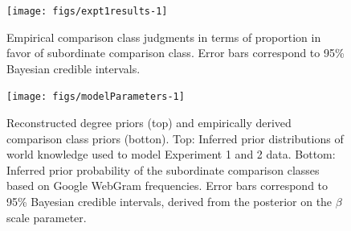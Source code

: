 \documentclass[doc]{apa6}
\begin{document}

\begin{figure}[htb]

{\centering \texttt{[image: figs/expt1results-1]} 

}

\caption{Empirical comparison class judgments in terms of proportion in favor of subordinate comparison class.  Error bars correspond to 95\% Bayesian credible intervals.}\label{fig:expt1results}
\end{figure}

\begin{figure}[htb]

{\centering \texttt{[image: figs/modelParameters-1]} 

}

\caption{Reconstructed degree priors (top) and empirically derived comparison class priors (botton). Top: Inferred prior distributions of world knowledge used to model Experiment 1 and 2 data. Bottom: Inferred prior probability of the subordinate comparison classes based on Google WebGram frequencies. Error bars correspond to 95\% Bayesian credible intervals, derived from the posterior on the $\beta$ scale parameter.}\label{fig:modelParameters}
\end{figure}
\end{document}
